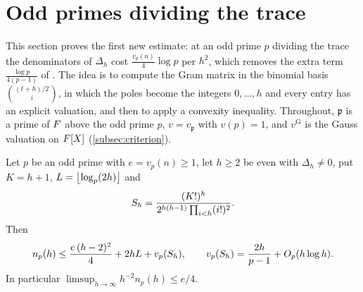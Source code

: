 \section{Odd primes dividing the trace}\label{sec:trace-primes}

This section proves the first new estimate: at an odd prime $p$ dividing the trace the
denominators of $\Delta_h$ cost $\frac{v_p(n)}4\log p$ per $h^2$, which removes the extra term
$\frac{\log p}{4(p-1)}$ of \cite[Lemma~3.8]{Krisman2026units}. The idea is to compute the Gram
matrix in the binomial basis $\binom{(t+h)/2}{i}$, in which the poles become the integers
$0,\dots,h$ and every entry has an explicit valuation, and then to apply a convexity inequality.
Throughout, $\mathfrak p$ is a prime of $F$ above the odd prime $p$, $v=v_{\mathfrak p}$ with
$v(p)=1$, and $v^{\mathrm G}$ is the Gauss valuation on $F[X]$ (\cref{subsec:criterion}).

\begin{theorem}\label{thm:trace-primes}
Let $p$ be an odd prime with $e=v_p(n)\ge1$, let $h\ge2$ be even with $\Delta_h\ne0$, put
$K=h+1$, $L=\left\lfloor \log_p(2h)\right\rfloor$ and
\begin{equation}\label{eq:Sh}
S_h=\frac{(K!)^h}{2^{h(h-1)}\prod_{i<h}(i!)^2}.
\end{equation}
Then
\begin{equation}\label{eq:trace-prime-bound}
n_p(h)\le\frac{e\,(h-2)^2}{4}+2hL+v_p(S_h),\qquad
v_p(S_h)=\frac{2h}{p-1}+O_p(h\log h).
\end{equation}
In particular $\limsup_{h\to\infty}h^{-2}n_p(h)\le e/4$.
\end{theorem}

